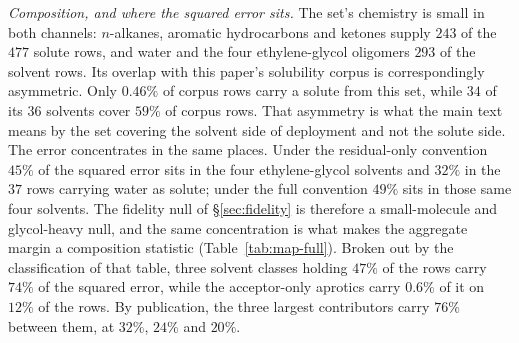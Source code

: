 \emph{Composition, and where the squared error sits.} The set's chemistry is small in both
channels: $n$-alkanes, aromatic hydrocarbons and ketones supply $243$ of the $477$ solute rows, and
water and the four ethylene-glycol oligomers $293$ of the solvent rows. Its overlap with this paper's solubility corpus is correspondingly asymmetric. Only $0.46\%$ of
corpus rows carry a solute from this set, while $34$ of its $36$ solvents cover $59\%$ of corpus
rows. That asymmetry is what the main text means by the set covering the solvent side of deployment
and not the solute side. The error concentrates in the same places. Under the residual-only convention $45\%$ of the
squared error sits in the four ethylene-glycol solvents and $32\%$ in the $37$ rows carrying water
as solute; under the full convention $49\%$ sits in those same four solvents. The fidelity null of
\S\ref{sec:fidelity} is therefore a small-molecule and glycol-heavy null, and the same
concentration is what makes the aggregate margin a composition statistic
(Table~\ref{tab:map-full}). Broken out by the classification of that table, three solvent classes holding $47\%$ of the rows
carry $74\%$ of the squared error, while the acceptor-only aprotics carry $0.6\%$ of it on $12\%$ of
the rows. By publication, the three largest contributors carry $76\%$ between them, at $32\%$,
$24\%$ and $20\%$.

